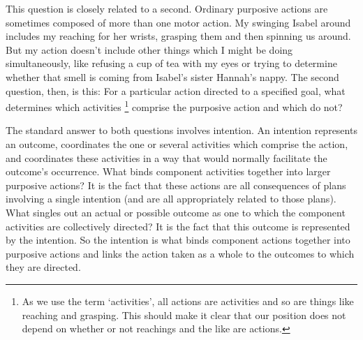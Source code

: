 \documentclass[12pt,\papersize]{extarticle}
\begin{document}
This question is closely related to a second.
Ordinary purposive actions are sometimes composed of more than one motor action.  My swinging Isabel around includes my reaching for her wrists, grasping them and then spinning us around.  
But  my action doesn’t include other things which I might be doing simultaneously, like refusing a cup of tea with my eyes or  trying to determine whether that smell is coming from Isabel’s sister Hannah’s nappy.
The second question, then, is this: For a particular action directed to a specified goal, what determines which activities%
\footnote{
As we use the term `activities',
all actions are activities 
and so are  things like reaching and grasping.
This should make it clear that our position does not depend on whether or not reachings and the like are  actions.
} 
comprise the purposive action and which do not?

The standard answer to both questions involves intention.
An intention represents an outcome, coordinates the one or several activities which comprise the action, and coordinates these activities in a way that would normally facilitate the outcome's occurrence.
What binds component activities together into larger purposive actions?  
It is the fact that these actions are all consequences of plans involving a single intention (and are all appropriately related to those plans).
What singles out an actual or possible outcome as one to which the component activities are collectively directed?  
It is the fact that this outcome is represented by the intention.
So the intention is what binds component actions together into purposive actions and links the action taken as a whole to the outcomes to which they are directed.
\end{document}

